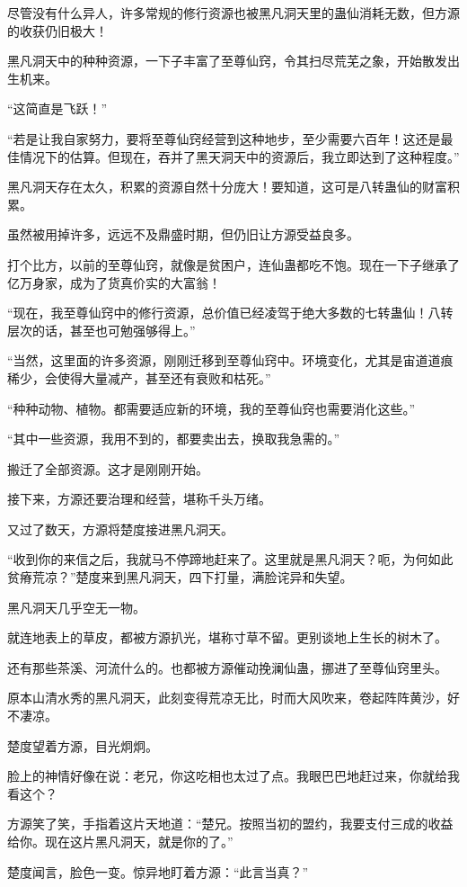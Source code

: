 \begin{this_body}
尽管没有什么异人，许多常规的修行资源也被黑凡洞天里的蛊仙消耗无数，但方源的收获仍旧极大！

黑凡洞天中的种种资源，一下子丰富了至尊仙窍，令其扫尽荒芜之象，开始散发出生机来。

“这简直是飞跃！”

“若是让我自家努力，要将至尊仙窍经营到这种地步，至少需要六百年！这还是最佳情况下的估算。但现在，吞并了黑天洞天中的资源后，我立即达到了这种程度。”

黑凡洞天存在太久，积累的资源自然十分庞大！要知道，这可是八转蛊仙的财富积累。

虽然被用掉许多，远远不及鼎盛时期，但仍旧让方源受益良多。

打个比方，以前的至尊仙窍，就像是贫困户，连仙蛊都吃不饱。现在一下子继承了亿万身家，成为了货真价实的大富翁！

“现在，我至尊仙窍中的修行资源，总价值已经凌驾于绝大多数的七转蛊仙！八转层次的话，甚至也可勉强够得上。”

“当然，这里面的许多资源，刚刚迁移到至尊仙窍中。环境变化，尤其是宙道道痕稀少，会使得大量减产，甚至还有衰败和枯死。”

“种种动物、植物。都需要适应新的环境，我的至尊仙窍也需要消化这些。”

“其中一些资源，我用不到的，都要卖出去，换取我急需的。”

搬迁了全部资源。这才是刚刚开始。

接下来，方源还要治理和经营，堪称千头万绪。

又过了数天，方源将楚度接进黑凡洞天。

“收到你的来信之后，我就马不停蹄地赶来了。这里就是黑凡洞天？呃，为何如此贫瘠荒凉？”楚度来到黑凡洞天，四下打量，满脸诧异和失望。

黑凡洞天几乎空无一物。

就连地表上的草皮，都被方源扒光，堪称寸草不留。更别谈地上生长的树木了。

还有那些茶溪、河流什么的。也都被方源催动挽澜仙蛊，挪进了至尊仙窍里头。

原本山清水秀的黑凡洞天，此刻变得荒凉无比，时而大风吹来，卷起阵阵黄沙，好不凄凉。

楚度望着方源，目光炯炯。

脸上的神情好像在说：老兄，你这吃相也太过了点。我眼巴巴地赶过来，你就给我看这个？

方源笑了笑，手指着这片天地道：“楚兄。按照当初的盟约，我要支付三成的收益给你。现在这片黑凡洞天，就是你的了。”

楚度闻言，脸色一变。惊异地盯着方源：“此言当真？”


\end{this_body}
